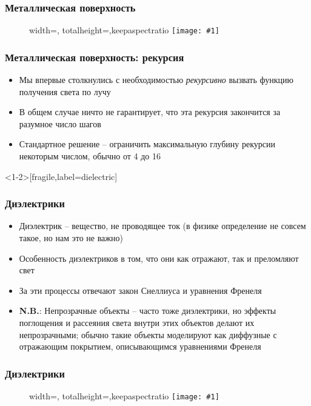 \documentclass[10pt]{beamer}
\newcommand{\slideimage}[1]{
  \begin{figure}
    \begin{adjustbox}{width=\textwidth, totalheight=\textheight-2\baselineskip-2\baselineskip,keepaspectratio}
      \texttt{[image: \#1]}
    \end{adjustbox}
  \end{figure}
}
\begin{document}
\begin{frame}[fragile]
\frametitle{Металлическая поверхность}
\slideimage{reflection.png}
\end{frame}

\begin{frame}[fragile]
\frametitle{Металлическая поверхность: рекурсия}
\begin{itemize}
\item Мы впервые столкнулись с необходимостью \textit{рекурсивно} вызвать функцию получения света по лучу
\pause
\item В общем случае ничто не гарантирует, что эта рекурсия закончится за разумное число шагов
\pause
\item Стандартное решение -- ограничить максимальную глубину рекурсии некоторым числом, обычно от 4 до 16
\end{itemize}
\end{frame}





\begin{frame}<1-2>[fragile,label=dielectric]
\frametitle{Диэлектрики}
\begin{itemize}
\item Диэлектрик -- вещество, не проводящее ток (в физике определение не совсем такое, но нам это не важно)
\pause
\item Особенность диэлектриков в том, что они как отражают, так и преломляют свет
\pause
\item За эти процессы отвечают закон Снеллиуса и уравнения Френеля
\pause
\item \alert{\textbf{N.B.}}: Непрозрачные объекты -- часто тоже диэлектрики, но эффекты поглощения и рассеяния света внутри этих объектов делают их непрозрачными; обычно такие объекты моделируют как диффузные с отражающим покрытием, описывающимся уравнениями Френеля
\end{itemize}
\end{frame}

\begin{frame}[fragile]
\frametitle{Диэлектрики}
\slideimage{dielectric.jpg}
\end{frame}

\end{document}
